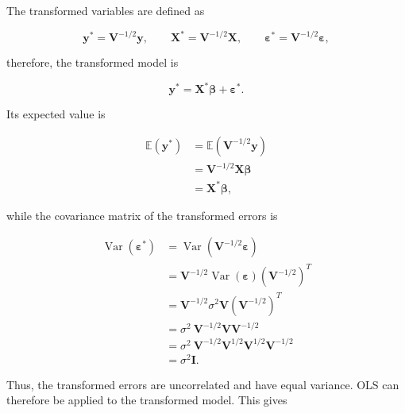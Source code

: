 \documentclass[english]{pwr_wmat_praca_dyplomowa}
\theoremstyle{definition}
\theoremstyle{remark}
\begin{document}
The transformed variables are defined as

\begin{equation}
    \mathbf{y}^{\ast} = \mathbf{V}^{-1/2}\mathbf{y}, \qquad \mathbf{X}^{\ast} = \mathbf{V}^{-1/2}\mathbf{X}, \qquad \boldsymbol{\varepsilon}^{\ast} = \mathbf{V}^{-1/2}\boldsymbol{\varepsilon},
    \label{eq:prewhitening-transform}
\end{equation}

therefore, the transformed model is

\begin{equation}
    \mathbf{y}^{\ast} = \mathbf{X}^{\ast}\boldsymbol{\beta} + \boldsymbol{\varepsilon}^{\ast}.
\end{equation}

Its expected value is

\begin{equation}
    \begin{aligned}
        \mathbb{E}\left(\mathbf{y}^{\ast}\right) &= \mathbb{E}\left(\mathbf{V}^{-1/2}\mathbf{y}\right) \\
        &= \mathbf{V}^{-1/2}\mathbf{X}\boldsymbol{\beta} \\
        &= \mathbf{X}^{\ast}\boldsymbol{\beta},
    \end{aligned}
\end{equation}

while the covariance matrix of the transformed errors is

\begin{equation}
    \begin{aligned}
        \operatorname{Var}\left(\boldsymbol{\varepsilon}^{\ast}\right) &= \operatorname{Var}\left( \mathbf{V}^{-1/2}\boldsymbol{\varepsilon} \right) \\
        &= \mathbf{V}^{-1/2} \operatorname{Var}(\boldsymbol{\varepsilon}) \left( \mathbf{V}^{-1/2} \right)^T \\
        &= \mathbf{V}^{-1/2} \sigma^2\mathbf{V} \left(\mathbf{V}^{-1/2}\right)^T \\
        &= \sigma^2\ \mathbf{V}^{-1/2} \mathbf{V} \mathbf{V}^{-1/2} \\
        &= \sigma^2\ \mathbf{V}^{-1/2} \mathbf{V}^{1/2} \mathbf{V}^{1/2} \mathbf{V}^{-1/2} \\
        &= \sigma^2\mathbf{I}.
    \end{aligned}
\end{equation}

Thus, the transformed errors are uncorrelated and have equal variance. OLS can therefore be applied to the transformed model. This gives
\end{document}
